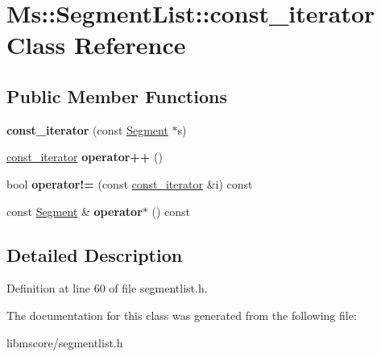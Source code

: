 \hypertarget{class_ms_1_1_segment_list_1_1const__iterator}{}\section{Ms\+:\+:Segment\+List\+:\+:const\+\_\+iterator Class Reference}
\label{class_ms_1_1_segment_list_1_1const__iterator}
\subsection*{Public Member Functions}
\begin{DoxyCompactItemize}
\item 
\mbox{\label{class_ms_1_1_segment_list_1_1const__iterator_ab846947c22a11d1cd039a8a9b56116bb}} 
{\bfseries const\+\_\+iterator} (const \hyperlink{class_ms_1_1_segment}{Segment} $\ast$s)
\item 
\mbox{\label{class_ms_1_1_segment_list_1_1const__iterator_a7016b0b2b76b58fb9cad3757bb3f998f}} 
\hyperlink{class_ms_1_1_segment_list_1_1const__iterator}{const\+\_\+iterator} {\bfseries operator++} ()
\item 
\mbox{\label{class_ms_1_1_segment_list_1_1const__iterator_a98b43524ac62874711218459667f0043}} 
bool {\bfseries operator!=} (const \hyperlink{class_ms_1_1_segment_list_1_1const__iterator}{const\+\_\+iterator} \&i) const
\item 
\mbox{\label{class_ms_1_1_segment_list_1_1const__iterator_a36a8d0a9f30989bd906f7efde8d0e103}} 
const \hyperlink{class_ms_1_1_segment}{Segment} \& {\bfseries operator$\ast$} () const
\end{DoxyCompactItemize}


\subsection{Detailed Description}


Definition at line 60 of file segmentlist.\+h.



The documentation for this class was generated from the following file\+:\begin{DoxyCompactItemize}
\item 
libmscore/segmentlist.\+h\end{DoxyCompactItemize}
